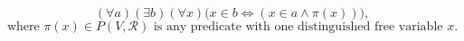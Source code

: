 $$
(\forall a)(\exists b)(\forall x)\bigl(x \in b \Leftrightarrow (x \in a \land \pi(x))\bigr),
$$
$$
\text{where } \pi(x) \in P(V, \mathcal{R}) \text{ is any predicate with one distinguished free variable } x.
$$
